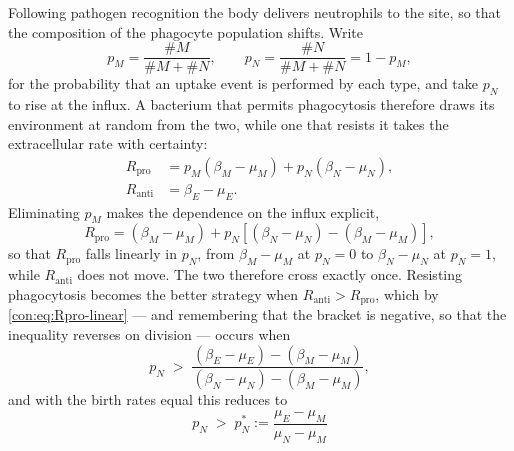\documentclass[11pt,a4paper]{report}
\newcommand{\lrbs}[1]{\left[#1\right]}
\theoremstyle{plain}
\theoremstyle{remark}
\begin{document}
Following pathogen recognition the body delivers neutrophils to the site, so
that the composition of the phagocyte population shifts. Write
\begin{equation}
p_M=\frac{\#M}{\#M+\#N},\qquad
p_N=\frac{\#N}{\#M+\#N}=1-p_M ,
\label{con:eq:fractions}
\end{equation}
for the probability that an uptake event is performed by each type, and take
$p_N$ to rise at the influx. A bacterium that permits phagocytosis therefore
draws its environment at random from the two, while one that resists it takes
the extracellular rate with certainty:
\begin{align}
R_{\mathrm{pro}}&=p_M(\beta_M-\mu_M)+p_N(\beta_N-\mu_N),
\label{con:eq:Rpro}\\
R_{\mathrm{anti}}&=\beta_E-\mu_E .
\label{con:eq:Ranti}
\end{align}
Eliminating $p_M$ makes the dependence on the influx explicit,
\begin{equation}
R_{\mathrm{pro}}
=(\beta_M-\mu_M)+p_N\lrbs{(\beta_N-\mu_N)-(\beta_M-\mu_M)} ,
\label{con:eq:Rpro-linear}
\end{equation}
so that $R_{\mathrm{pro}}$ falls linearly in $p_N$, from $\beta_M-\mu_M$ at
$p_N=0$ to $\beta_N-\mu_N$ at $p_N=1$, while $R_{\mathrm{anti}}$ does not
move. The two therefore cross exactly once. Resisting phagocytosis becomes
the better strategy when $R_{\mathrm{anti}}>R_{\mathrm{pro}}$, which by
\cref{con:eq:Rpro-linear} --- and remembering that the bracket is negative,
so that the inequality reverses on division --- occurs when
\begin{equation}
p_N \;>\;
\frac{(\beta_E-\mu_E)-(\beta_M-\mu_M)}{(\beta_N-\mu_N)-(\beta_M-\mu_M)} ,
\label{con:eq:threshold-general}
\end{equation}
and with the birth rates equal this reduces to
\begin{equation}
\boxed{\;p_N \;>\; p_N^{\ast}
:=\frac{\mu_E-\mu_M}{\mu_N-\mu_M}\;}
\label{con:eq:threshold}
\end{equation}
\end{document}
